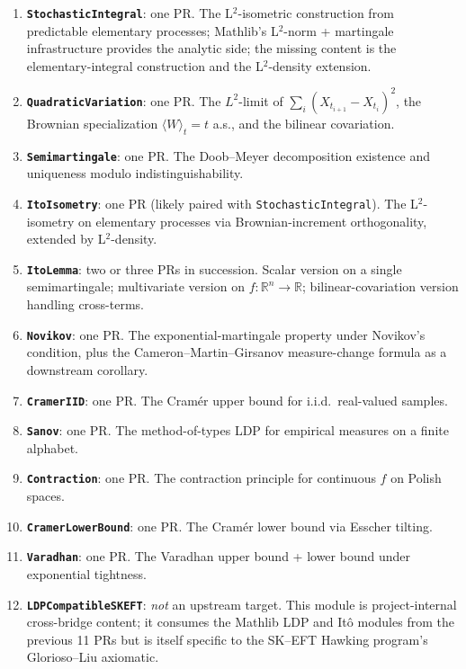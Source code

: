 \documentclass[11pt]{article}
\newcommand{\R}{\mathbb{R}}
\begin{document}
\begin{enumerate}
\item \textbf{\texttt{StochasticIntegral}}: one PR. The L${}^2$-isometric
  construction from predictable elementary processes; Mathlib's
  L${}^2$-norm + martingale infrastructure provides the analytic
  side; the missing content is the elementary-integral construction
  and the L${}^2$-density extension.
\item \textbf{\texttt{QuadraticVariation}}: one PR. The
  $L^2$-limit of $\sum_i (X_{t_{i+1}} - X_{t_i})^2$, the Brownian
  specialization $\langle W\rangle_t = t$ a.s., and the bilinear
  covariation.
\item \textbf{\texttt{Semimartingale}}: one PR. The
  Doob--Meyer decomposition existence and uniqueness modulo
  indistinguishability.
\item \textbf{\texttt{ItoIsometry}}: one PR (likely paired with
  \texttt{StochasticIntegral}). The L${}^2$-isometry on
  elementary processes via Brownian-increment orthogonality, extended
  by L${}^2$-density.
\item \textbf{\texttt{ItoLemma}}: two or three PRs in succession.
  Scalar version on a single semimartingale; multivariate version on
  $f: \R^n \to \R$; bilinear-covariation version handling cross-terms.
\item \textbf{\texttt{Novikov}}: one PR. The exponential-martingale
  property under Novikov's condition, plus the
  Cameron--Martin--Girsanov measure-change formula as a downstream
  corollary.
\item \textbf{\texttt{CramerIID}}: one PR. The Cram\'er upper bound
  for i.i.d.\ real-valued samples.
\item \textbf{\texttt{Sanov}}: one PR. The method-of-types LDP for
  empirical measures on a finite alphabet.
\item \textbf{\texttt{Contraction}}: one PR. The contraction principle
  for continuous $f$ on Polish spaces.
\item \textbf{\texttt{CramerLowerBound}}: one PR. The Cram\'er
  lower bound via Esscher tilting.
\item \textbf{\texttt{Varadhan}}: one PR. The Varadhan upper bound +
  lower bound under exponential tightness.
\item \textbf{\texttt{LDPCompatibleSKEFT}}: \emph{not} an upstream
  target. This module is project-internal cross-bridge content; it
  consumes the Mathlib LDP and It\^o modules from the previous 11
  PRs but is itself specific to the SK--EFT Hawking program's
  Glorioso--Liu axiomatic.
\end{enumerate}
\end{document}
